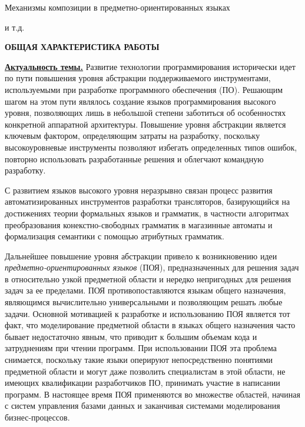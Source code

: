 \documentclass[12pt,a4paper]{article}
\date{}
\makeatletter
\newcommand{\term}[1]{\emph{#1}}
\theoremstyle{definition}
\theoremstyle{plain}
\renewcommand{\@oddhead}{\hfill{\large -\thepage-}\hfill}
\renewcommand{\@oddfoot}{}
\renewcommand{\@evenhead}{\hfill{\large -\thepage-}\hfill}
\renewcommand{\@evenfoot}{}
\newcommand{\afsection}[1]{\par \begin{center}\textbf{\MakeUppercase{#1}}\end{center}}
\newcommand{\afsubsection}[1]{\par \textbf{\underline{#1}}}
\makeatother
\begin{document}
Механизмы композиции в предметно-ориентированных языках

и т.д.

\thispagestyle{empty}
\newpage


\setlength{\topmargin}{-5mm} \makeatletter
\renewcommand{\@oddhead}{\hfill{\large -\thepage-}\hfill}
\renewcommand{\@oddfoot}{}
\renewcommand{\@evenhead}{\hfill{\large -\thepage-}\hfill}
\renewcommand{\@evenfoot}{}
\makeatother

\afsection{Общая характеристика работы}

\afsubsection{Актуальность темы.}
Развитие технологии программирования исторически идет по пути повышения уровня абстракции поддерживаемого инструментами, используемыми при разработке программного обеспечения (ПО). Решающим шагом на этом пути являлось создание языков программирования высокого уровня, позволяющих лишь в небольшой степени заботиться об особенностях конкретной аппаратной архитектуры. Повышение уровня абстракции является ключевым фактором, определяющим затраты на разработку, поскольку высокоуровневые инструменты позволяют избегать определенных типов ошибок, повторно использовать разработанные решения и облегчают командную разработку.

С развитием языков высокого уровня неразрывно связан процесс развития автоматизированных инструментов разработки трансляторов, базирующийся на достижениях теории формальных языков и грамматик, в частности алгоритмах преобразования конекстно-свободных грамматик в магазинные автоматы и формализация семантики с помощью атрибутных грамматик.

Дальнейшее повышение уровня абстракции привело к возникновению идеи \term{предметно-ориентированных языков} (ПОЯ), предназначенных для решения задач в относительно узкой предметной области и нередко непригодных для решения задач за ее пределами. ПОЯ противопоставляются языкам общего назначения, являющимся вычислительно универсальными и позволяющим решать любые задачи. Основной мотивацией к разработке и использованию ПОЯ является тот факт, что моделирование предметной области в языках общего назначения часто бывает недостаточно явным, что приводит к большим объемам кода и затруднениям при чтении программ. При использовании ПОЯ эта проблема снимается, поскольку такие языки оперируют непосредственно понятиями предметной области и могут даже позволить специалистам в этой области, не имеющих квалификации разработчиков ПО, принимать участие в написании программ. В настоящее время ПОЯ применяются во множестве областей, начиная с систем управления базами данных и заканчивая системами моделирования бизнес-процессов.
\end{document}
